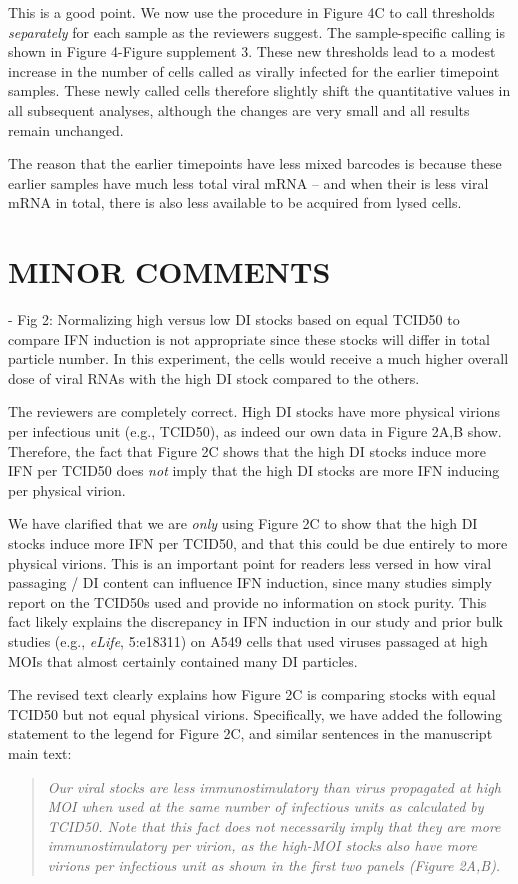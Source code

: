 \documentclass[11pt, oneside]{article}   	%
\begin{document}
{\color{black}
This is a good point. 
We now use the procedure in Figure 4C to call thresholds \emph{separately} for each sample as the reviewers suggest.
The sample-specific calling is shown in Figure 4-Figure supplement 3.
These new thresholds lead to a modest increase in the number of cells called as virally infected for the earlier timepoint samples.
These newly called cells therefore slightly shift the quantitative values in all subsequent analyses, although the changes are very small and all results remain unchanged.

The reason that the earlier timepoints have less mixed barcodes is because these earlier samples have much less total viral mRNA -- and when their is less viral mRNA in total, there is also less available to be acquired from lysed cells.
}

\section*{MINOR COMMENTS}

- Fig 2: Normalizing high versus low DI stocks based on equal TCID50 to compare IFN induction is not appropriate since these stocks will differ in total particle number. In this experiment, the cells would receive a much higher overall dose of viral RNAs with the high DI stock compared to the others. 

{\color{black}
The reviewers are completely correct.
High DI stocks have more physical virions per infectious unit (e.g., TCID50), as indeed our own data in Figure 2A,B show.
Therefore, the fact that Figure 2C shows that the high DI stocks induce more IFN per TCID50 does \emph{not} imply that the high DI stocks are more IFN inducing per physical virion.

We have clarified that we are \emph{only} using Figure 2C to show that the high DI stocks induce more IFN per TCID50, and that this could be due entirely to more physical virions.
This is an important point for readers less versed in how viral passaging / DI content can influence IFN induction, since many studies simply report on the TCID50s used and provide no information on stock purity.
This fact likely explains the discrepancy in IFN induction in our study and prior bulk studies (e.g., \textit{eLife}, 5:e18311) on A549 cells that used viruses passaged at high MOIs that almost certainly contained many DI particles.

The revised text clearly explains how Figure 2C is comparing stocks with equal TCID50 but not equal physical virions. 
Specifically, we have added the following statement to the legend for Figure 2C, and similar sentences in the manuscript main text:
\begin{quote}
\textsl{
Our viral stocks are less immunostimulatory than virus propagated at high MOI when used at the same number of infectious units as calculated by TCID50.
Note that this fact does not necessarily imply that they are more immunostimulatory per virion, as the high-MOI stocks also have more virions per infectious unit as shown in the first two panels (Figure 2A,B).}
\end{quote}
}
\end{document}
